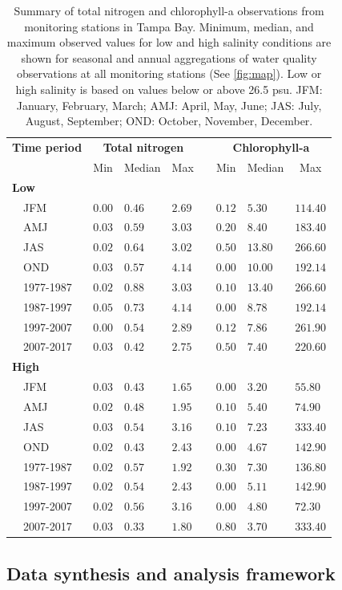 \documentclass[]{article}
\begin{document}
\begin{table}[!tbp]
\caption{Summary of total nitrogen and chlorophyll-a observations from monitoring stations in Tampa Bay.  Minimum, median, and maximum observed values for low and high salinity conditions are shown for seasonal and annual aggregations of water quality observations at all monitoring stations (See \cref{fig:map}).  Low or high salinity is based on values below or above 26.5 psu. JFM: January, February, March; AMJ: April, May, June; JAS: July, August, September; OND: October, November, December.\label{tab:statsum}} 
\begin{center}
\begin{tabular}{llllclll}
\hline\hline
\multicolumn{1}{l}{\bfseries Time period}&\multicolumn{3}{c}{\bfseries Total nitrogen}&\multicolumn{1}{c}{\bfseries }&\multicolumn{3}{c}{\bfseries Chlorophyll-a}\tabularnewline
\cline{2-4} \cline{6-8}
\multicolumn{1}{l}{}&\multicolumn{1}{c}{Min}&\multicolumn{1}{c}{Median}&\multicolumn{1}{c}{Max}&\multicolumn{1}{c}{}&\multicolumn{1}{c}{Min}&\multicolumn{1}{c}{Median}&\multicolumn{1}{c}{Max}\tabularnewline
\hline
{\bfseries Low}&&&&&&&\tabularnewline
~~JFM&$0.00$&$0.46$&$2.69$&&$0.12$&$ 5.30$&$114.40$\tabularnewline
~~AMJ&$0.03$&$0.59$&$3.03$&&$0.20$&$ 8.40$&$183.40$\tabularnewline
~~JAS&$0.02$&$0.64$&$3.02$&&$0.50$&$13.80$&$266.60$\tabularnewline
~~OND&$0.03$&$0.57$&$4.14$&&$0.00$&$10.00$&$192.14$\tabularnewline
~~1977-1987&$0.02$&$0.88$&$3.03$&&$0.10$&$13.40$&$266.60$\tabularnewline
~~1987-1997&$0.05$&$0.73$&$4.14$&&$0.00$&$ 8.78$&$192.14$\tabularnewline
~~1997-2007&$0.00$&$0.54$&$2.89$&&$0.12$&$ 7.86$&$261.90$\tabularnewline
~~2007-2017&$0.03$&$0.42$&$2.75$&&$0.50$&$ 7.40$&$220.60$\tabularnewline
\hline
{\bfseries High}&&&&&&&\tabularnewline
~~JFM&$0.03$&$0.43$&$1.65$&&$0.00$&$ 3.20$&$ 55.80$\tabularnewline
~~AMJ&$0.02$&$0.48$&$1.95$&&$0.10$&$ 5.40$&$ 74.90$\tabularnewline
~~JAS&$0.03$&$0.54$&$3.16$&&$0.10$&$ 7.23$&$333.40$\tabularnewline
~~OND&$0.02$&$0.43$&$2.43$&&$0.00$&$ 4.67$&$142.90$\tabularnewline
~~1977-1987&$0.02$&$0.57$&$1.92$&&$0.30$&$ 7.30$&$136.80$\tabularnewline
~~1987-1997&$0.02$&$0.54$&$2.43$&&$0.00$&$ 5.11$&$142.90$\tabularnewline
~~1997-2007&$0.02$&$0.56$&$3.16$&&$0.00$&$ 4.80$&$ 72.30$\tabularnewline
~~2007-2017&$0.03$&$0.33$&$1.80$&&$0.80$&$ 3.70$&$333.40$\tabularnewline
\hline
\end{tabular}\end{center}
\end{table}

\hypertarget{data-synthesis-and-analysis-framework}{%
\subsection{Data synthesis and analysis
framework}\label{data-synthesis-and-analysis-framework}}
\end{document}
